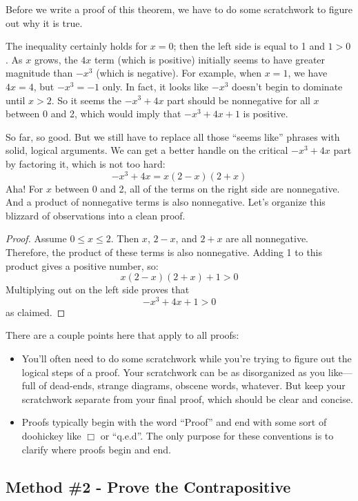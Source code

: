Before we write a proof of this theorem, we have to do some
scratchwork to figure out why it is true.

The inequality certainly holds for $x = 0$; then the left side is
equal to 1 and $1 > 0$.  As $x$ grows, the $4x$ term (which is
positive) initially seems to have greater magnitude than $-x^3$ (which
is negative).  For example, when $x = 1$, we have $4x = 4$, but $-x^3
= -1$ only.  In fact, it looks like $-x^3$ doesn't begin to dominate
until $x > 2$.  So it seems the $-x^3 + 4x$ part should be nonnegative
for all $x$ between 0 and 2, which would imply that $-x^3 + 4x + 1$ is
positive.

So far, so good.  But we still have to replace all those ``seems
like'' phrases with solid, logical arguments.  We can get a better
handle on the critical $-x^3 + 4x$ part by factoring it, which is not
too hard:
%
\[
-x^3 + 4x = x (2 - x)(2 + x)
\]
%
Aha!  For $x$ between 0 and 2, all of the terms on the right side are
nonnegative.  And a product of nonnegative terms is also nonnegative.
Let's organize this blizzard of observations into a clean proof.

\begin{proof}
Assume $0 \leq x \leq 2$.  Then $x$, $2 - x$, and $2 + x$ are all
nonnegative.  Therefore, the product of these terms is also
nonnegative.  Adding 1 to this product gives a positive number, so:
%
\[
x (2 - x)(2 + x) + 1 > 0
\]
%
Multiplying out on the left side proves that
%
\[
-x^3 + 4x + 1 > 0
\]
%
as claimed.
\end{proof}

There are a couple points here that apply to all proofs:
%
\begin{itemize}

\item You'll often need to do some scratchwork while you're trying to
figure out the logical steps of a proof.  Your scratchwork can be as
disorganized as you like--- full of dead-ends, strange diagrams,
obscene words, whatever.  But keep your scratchwork separate from your
final proof, which should be clear and concise.

\item Proofs typically begin with the word ``Proof'' and end with some
sort of doohickey like $\Box$ or ``q.e.d''.  The only purpose for
these conventions is to clarify where proofs begin and end.

\end{itemize}

\subsection{Method \#2 - Prove the Contrapositive}

